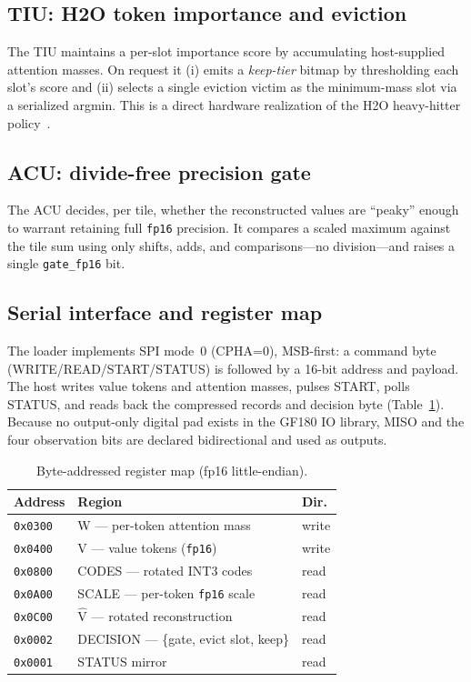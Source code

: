 \documentclass[conference]{IEEEtran}
\begin{document}
\subsection{TIU: H2O token importance and eviction}
The TIU maintains a per-slot importance score by accumulating host-supplied
attention masses. On request it (i) emits a \emph{keep-tier} bitmap by
thresholding each slot's score and (ii) selects a single eviction victim as the
minimum-mass slot via a serialized argmin. This is a direct hardware realization
of the H2O heavy-hitter policy~\cite{h2o}.

\subsection{ACU: divide-free precision gate}
The ACU decides, per tile, whether the reconstructed values are ``peaky'' enough
to warrant retaining full \texttt{fp16} precision. It compares a scaled maximum
against the tile sum using only shifts, adds, and comparisons---no division---and
raises a single \texttt{gate\_fp16} bit.

\subsection{Serial interface and register map}
The loader implements SPI mode~0 (CPHA=0), MSB-first: a command byte
(WRITE/READ/START/STATUS) is followed by a 16-bit address and payload. The host
writes value tokens and attention masses, pulses START, polls STATUS, and reads
back the compressed records and decision byte (Table~\ref{tab:regmap}). Because
no output-only digital pad exists in the GF180 IO library, MISO and the four
observation bits are declared bidirectional and used as outputs.

\begin{table}[t]
\caption{Byte-addressed register map (fp16 little-endian).}
\label{tab:regmap}
\centering
\begin{tabular}{@{}lll@{}}
\toprule
Address & Region & Dir. \\
\midrule
\texttt{0x0300} & W --- per-token attention mass & write \\
\texttt{0x0400} & V --- value tokens (\texttt{fp16}) & write \\
\texttt{0x0800} & CODES --- rotated INT3 codes & read \\
\texttt{0x0A00} & SCALE --- per-token \texttt{fp16} scale & read \\
\texttt{0x0C00} & $\hat{\text{V}}$ --- rotated reconstruction & read \\
\texttt{0x0002} & DECISION --- \{gate, evict slot, keep\} & read \\
\texttt{0x0001} & STATUS mirror & read \\
\bottomrule
\end{tabular}
\end{table}
\end{document}
